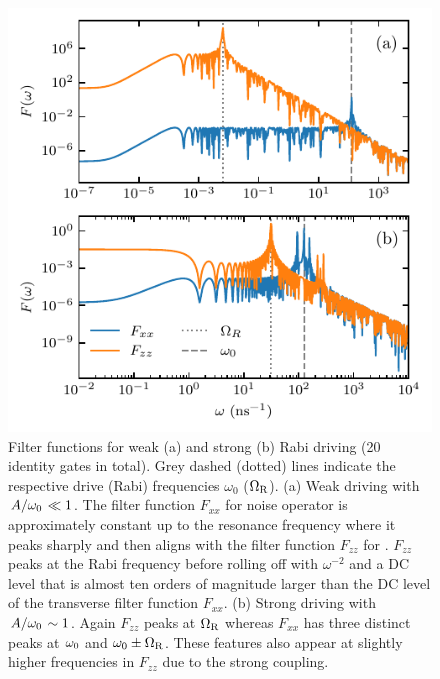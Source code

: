 \begin{figure}[tbp]
    \centering
    \includegraphics{img/pdf/rabi_driving_weak_vs_strong.pdf}
    \caption{
        Filter functions for weak (a) and strong (b) Rabi driving (\num{20} identity gates in total).
        Grey dashed (dotted) lines indicate the respective drive (Rabi) frequencies $\omega_0$ ($\Omega_{\mathrm{R}}$).
        (a) Weak driving with $\flatfrac{A}{\omega_\mr{0}}\ll 1$.
        The filter function $F_{xx}$ for noise operator \px is approximately constant up to the resonance frequency where it peaks sharply and then aligns with the filter function $F_{zz}$ for \pz.
        $F_{zz}$ peaks at the Rabi frequency before rolling off with $\omega^{-2}$ and a DC level that is almost ten orders of magnitude larger than the DC level of the transverse filter function $F_{xx}$.
        (b) Strong driving with $\flatfrac{A}{\omega_\mr{0}}\sim 1$.
        Again $F_{zz}$ peaks at $\Omega_{\mathrm{R}}$ whereas $F_{xx}$ has three distinct peaks at $\omega_{\mathrm{0}}$ and $\omega_{\mathrm{0}}\pm\Omega_{\mathrm{R}}$.
        These features also appear at slightly higher frequencies in $F_{zz}$ due to the strong coupling.
    }
    \label{fig:ff:filter_function:rabi:weak_vs_strong}
\end{figure}

